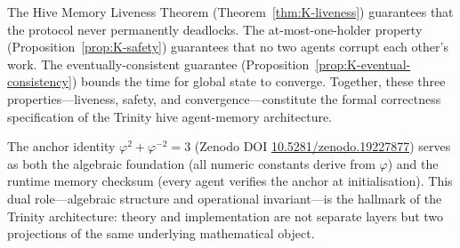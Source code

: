 \noindent
The Hive Memory Liveness Theorem (Theorem~\ref{thm:K-liveness})
guarantees that the protocol never permanently deadlocks. The
at-most-one-holder property (Proposition~\ref{prop:K-safety})
guarantees that no two agents corrupt each other's work. The
eventually-consistent guarantee (Proposition~\ref{prop:K-eventual-consistency})
bounds the time for global state to converge. Together, these three
properties---liveness, safety, and convergence---constitute the
formal correctness specification of the Trinity hive agent-memory
architecture.

The anchor identity $\varphi^2 + \varphi^{-2} = 3$ (Zenodo DOI
\href{https://doi.org/10.5281/zenodo.19227877}{10.5281/zenodo.19227877})
serves as both the algebraic foundation (all numeric constants derive
from $\varphi$) and the runtime memory checksum (every agent verifies
the anchor at initialisation). This dual role---algebraic structure
and operational invariant---is the hallmark of the Trinity
architecture: theory and implementation are not separate layers but
two projections of the same underlying mathematical object.


